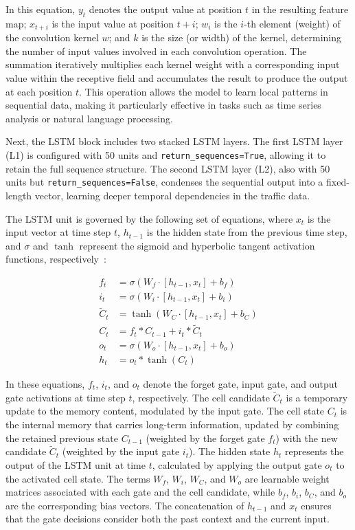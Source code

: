 \documentclass[ASNA,twocolumn]{USG} %
\begin{document}
In this equation, $y_t$ denotes the output value at position $t$ in the resulting feature map; $x_{t+i}$ is the input value at position $t+i$; $w_i$ is the $i$-th element (weight) of the convolution kernel $w$; and $k$ is the size (or width) of the kernel, determining the number of input values involved in each convolution operation. The summation iteratively multiplies each kernel weight with a corresponding input value within the receptive field and accumulates the result to produce the output at each position $t$. This operation allows the model to learn local patterns in sequential data, making it particularly effective in tasks such as time series analysis or natural language processing.


Next, the LSTM block includes two stacked LSTM layers. The first LSTM layer (L1) is configured with 50 units and \texttt{return\_sequences=True}, allowing it to retain the full sequence structure. The second LSTM layer (L2), also with 50 units but \texttt{return\_sequences=False}, condenses the sequential output into a fixed-length vector, learning deeper temporal dependencies in the traffic data.

The LSTM unit is governed by the following set of equations, where $x_t$ is the input vector at time step $t$, $h_{t-1}$ is the hidden state from the previous time step, and $\sigma$ and $\tanh$ represent the sigmoid and hyperbolic tangent activation functions, respectively~\cite{malashin2024applications}:

\begin{align}
f_t &= \sigma(W_f \cdot [h_{t-1}, x_t] + b_f) \\
i_t &= \sigma(W_i \cdot [h_{t-1}, x_t] + b_i) \\
\tilde{C}_t &= \tanh(W_C \cdot [h_{t-1}, x_t] + b_C) \\
C_t &= f_t * C_{t-1} + i_t * \tilde{C}_t \\
o_t &= \sigma(W_o \cdot [h_{t-1}, x_t] + b_o) \\
h_t &= o_t * \tanh(C_t)
\end{align}

In these equations, $f_t$, $i_t$, and $o_t$ denote the forget gate, input gate, and output gate activations at time step $t$, respectively. The cell candidate $\tilde{C}_t$ is a temporary update to the memory content, modulated by the input gate. The cell state $C_t$ is the internal memory that carries long-term information, updated by combining the retained previous state $C_{t-1}$ (weighted by the forget gate $f_t$) with the new candidate $\tilde{C}_t$ (weighted by the input gate $i_t$). The hidden state $h_t$ represents the output of the LSTM unit at time $t$, calculated by applying the output gate $o_t$ to the activated cell state. The terms $W_f$, $W_i$, $W_C$, and $W_o$ are learnable weight matrices associated with each gate and the cell candidate, while $b_f$, $b_i$, $b_C$, and $b_o$ are the corresponding bias vectors. The concatenation of $h_{t-1}$ and $x_t$ ensures that the gate decisions consider both the past context and the current input.
\end{document}
